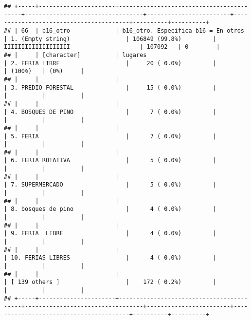 \documentclass[]{article}
\begin{document}
\begin{verbatim}
## +-----+----------------------+------------------------------------------+----------------------------------+------------------------+----------------------------------------+----------+----------+
## | 66  | b16_otro             | b16_otro. Especifica b16 = En otros      | 1. (Empty string)                | 106849 (99.8%)         | IIIIIIIIIIIIIIIIIII                    | 107092   | 0        |
## |     | [character]          | lugares                                  | 2. FERIA LIBRE                   |     20 ( 0.0%)         |                                        | (100%)   | (0%)     |
## |     |                      |                                          | 3. PREDIO FORESTAL               |     15 ( 0.0%)         |                                        |          |          |
## |     |                      |                                          | 4. BOSQUES DE PINO               |      7 ( 0.0%)         |                                        |          |          |
## |     |                      |                                          | 5. FERIA                         |      7 ( 0.0%)         |                                        |          |          |
## |     |                      |                                          | 6. FERIA ROTATIVA                |      5 ( 0.0%)         |                                        |          |          |
## |     |                      |                                          | 7. SUPERMERCADO                  |      5 ( 0.0%)         |                                        |          |          |
## |     |                      |                                          | 8. bosques de pino               |      4 ( 0.0%)         |                                        |          |          |
## |     |                      |                                          | 9. FERIA  LIBRE                  |      4 ( 0.0%)         |                                        |          |          |
## |     |                      |                                          | 10. FERIAS LIBRES                |      4 ( 0.0%)         |                                        |          |          |
## |     |                      |                                          | [ 139 others ]                   |    172 ( 0.2%)         |                                        |          |          |
## +-----+----------------------+------------------------------------------+----------------------------------+------------------------+----------------------------------------+----------+----------+

\end{verbatim}
\end{document}
